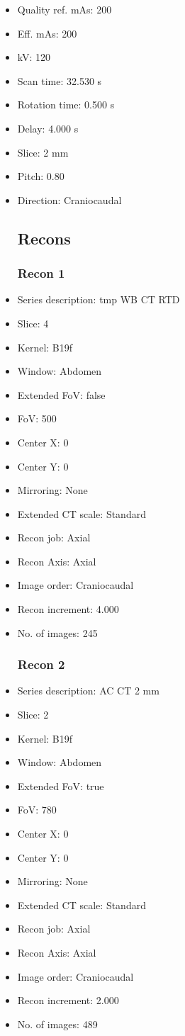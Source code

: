\documentclass[12pt]{article}
\begin{document}
\begin{itemize}
\subsection{Scan}
\item Quality ref. mAs: 200\item Eff. mAs: 200\item kV: 120\item Scan time: 32.530 s\item Rotation time: 0.500 s\item Delay: 4.000 s\item Slice: 2 mm\item Pitch: 0.80\item Direction: Craniocaudal\subsection{Recons}

\subsubsection{Recon 1}
\item Series description: tmp WB CT RTD
\item Slice: 4
\item Kernel: B19f
\item Window: Abdomen
\item Extended FoV: false
\item FoV: 500
\item Center X: 0
\item Center Y: 0
\item Mirroring: None
\item Extended CT scale: Standard
\item Recon job: Axial
\item Recon Axis: Axial
\item Image order: Craniocaudal
\item Recon increment: 4.000
\item No. of images: 245
\subsubsection{Recon 2}
\item Series description: AC CT 2 mm
\item Slice: 2
\item Kernel: B19f
\item Window: Abdomen
\item Extended FoV: true
\item FoV: 780
\item Center X: 0
\item Center Y: 0
\item Mirroring: None
\item Extended CT scale: Standard
\item Recon job: Axial
\item Recon Axis: Axial
\item Image order: Craniocaudal
\item Recon increment: 2.000
\item No. of images: 489

\end{itemize}
\end{document}
